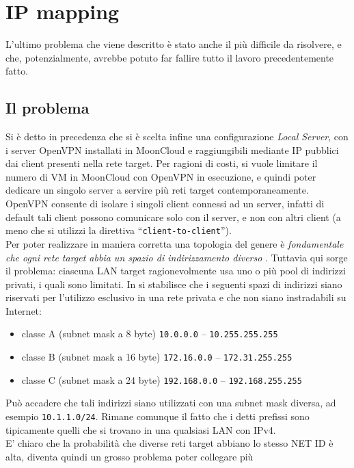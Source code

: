 \section{IP mapping}
L'ultimo problema che viene descritto  è stato anche il
più difficile da risolvere, e che, potenzialmente, avrebbe potuto far fallire
tutto il lavoro precedentemente fatto.

\subsection{Il problema}
Si è detto in precedenza che si è scelta infine una configurazione \textit{Local
Server}, con i server OpenVPN installati in MoonCloud e raggiungibili mediante IP
pubblici dai client presenti nella rete target. Per ragioni di costi, si vuole
limitare il numero di VM in MoonCloud con OpenVPN in esecuzione, e quindi poter
dedicare un singolo server a servire più reti target contemporaneamente. OpenVPN
consente di isolare i singoli client connessi ad un server, infatti di default
tali client possono comunicare solo con il server, e non con altri client (a meno
che si utilizzi la direttiva ``\texttt{client-to-client}'').\\
Per poter realizzare in maniera corretta una topologia del genere è
\textit{fondamentale che ogni rete target abbia un spazio di indirizzamento diverso} \cite{openvpn-lan-to-lan}.
Tuttavia qui sorge il problema: ciascuna LAN target ragionevolmente usa uno o più
pool di indirizzi privati, i quali sono limitati. In \cite{RFC1918} si
stabilisce che i seguenti spazi di indirizzi siano riservati per l'utilizzo esclusivo
in una rete privata e che non siano instradabili su Internet:
\begin{itemize}
	\item classe A (subnet mask a 8 byte) \texttt{10.0.0.0} -- \texttt{10.255.255.255}
	\item classe B (subnet mask a 16 byte) \texttt{172.16.0.0} -- \texttt{172.31.255.255}
	\item classe C (subnet mask a 24 byte) \texttt{192.168.0.0} -- \texttt{192.168.255.255}
\end{itemize}
Può accadere che tali indirizzi siano utilizzati con una subnet mask diversa, ad esempio
\texttt{10.1.1.0/24}. Rimane
comunque il fatto che i detti prefissi sono tipicamente quelli che si trovano
in una qualsiasi LAN con IPv4.\\
E' chiaro che la probabilità che diverse reti target abbiano lo stesso NET ID
è alta, diventa
quindi un grosso problema poter collegare più
